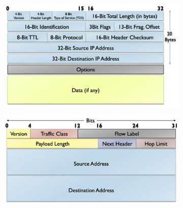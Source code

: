 \begin{figure}[h]
  \centering
  \begin{subfigure}[c]{0.45\textwidth}
    \centering
    \includegraphics[width=1.0\textwidth]{bilder/ipv4_header.png}
    \label{fig:ipv4_header}
  \end{subfigure}
  \begin{subfigure}[c]{0.45\textwidth}
    \centering
    \includegraphics[width=1.0\textwidth]{bilder/ipv6_header.png}
    \label{fig:ipv6_header}
  \end{subfigure}


\end{figure}
